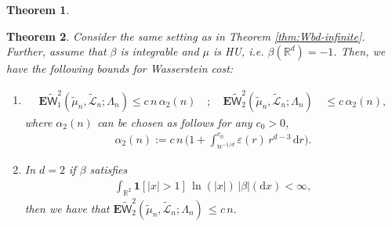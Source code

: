 \documentclass[12pt]{article}
\newtheorem{theorem}{Theorem}
\newcommand{\R}{\mathbb{R}}
\newcommand{\tLeb}{\tilde{\mathcal{L}}}
\newcommand{\bn}{   \mathsf b_{n}}
\newcommand{\1}{\mathbf{1}}
\newcommand{\md}{\mathrm{d}}
\newcommand{\red}[1]{\textcolor{red}{#1}}
\begin{document}
{{{{\begin{theorem}
%
%
\end{theorem}
%
\begin{theorem}
\label{thm:Wbd-infinite-HU}
Consider the same setting as in Theorem \ref{thm:Wbd-infinite}. Further, assume that $\beta $ is integrable and  $ \mu $ is HU, i.e. $\beta (\mathbb{R}^{d})= -1$. Then, we have the following bounds for Wasserstein cost:
%
\begin{enumerate}
\item
%
\begin{align}
\label{eq:rate-hu-Wp} {\mathbf{E}
  { \widetilde {\mathsf W}}_1^2(\tilde \mu _{n},\tLeb_{n};{\Lambda_n}) \leq c \, n \, \alpha_2(n)} \quad ; \quad \mathbf{E} { \widetilde{ \mathsf W}}_{2}^{2}(\tilde \mu _{n},\tLeb_{n};{\Lambda_n}) \,  & \leqslant c \, \alpha_{2} (n),
  \end{align}
%
where $\alpha_2(n)$ can be chosen as follows for any $c_0 > 0$,
\begin{align}
\label{eq:rate-hu}
\alpha_2(n) :=  c \, n \,
\big( 1+\int_{n^{-1/d}}^{c_{0}}\varepsilon(r) \, r^{d-3} \, { \md r} \big).
\end{align}
%
\item {In $d = 2$ if $\beta$ satisfies}
%
\begin{align*}\int_{\mathbb{R}^{2}}\mathbf{1}[ | x | >1] \, \ln( | x | ) \, | \beta  | (\md x)<\infty,
\end{align*}
%
then we have that $\mathbf{E} {\widetilde{ \mathsf W}}_{2}^{2}(\tilde \mu _{n},\tLeb_{n};{\Lambda_n}) \,   \leqslant c \, n.$
%
\end{enumerate}



\end{theorem}}}}}
\end{document}
